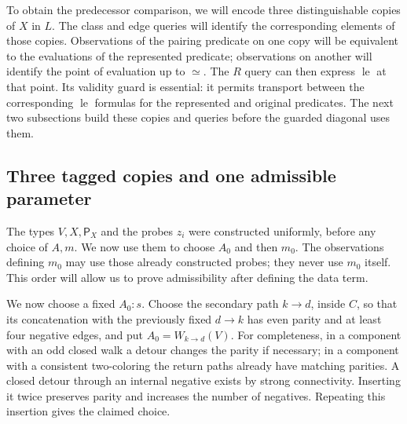 To obtain the predecessor comparison, we will encode three distinguishable
copies of $X$ in $L$.  The class and edge queries will identify the
corresponding elements of those copies.  Observations of the pairing
predicate on one copy will be equivalent to the evaluations of the
represented predicate; observations on another will identify the point
of evaluation up to $\simeq$.  The $R$ query can then express
$\operatorname{le}$ at that point.  Its validity guard is essential:
it permits transport between the corresponding
$\operatorname{le}$ formulas for the represented and original predicates.
The next two subsections build
these copies and queries before the guarded diagonal uses them.

\subsection{Three tagged copies and one admissible parameter}

The types $V,X,\mathsf P_X$ and the probes $z_i$ were constructed
uniformly, before any choice of $A,m$.  We now use them to choose
$A_0$ and then $m_0$.  The observations defining $m_0$ may use those
already constructed probes; they never use $m_0$ itself.  This order
will allow us to prove admissibility after defining the data term.

We now choose a fixed \(A_0:s\).  Choose the secondary path
\(k\to d\), inside \(C\), so that its concatenation with the
previously fixed \(d\to k\) has even parity and at least four
negative edges, and put \(A_0=W_{k\to d}(V)\).
For completeness, in a component with an odd closed walk a
detour changes the parity if necessary; in a component with a
consistent two-coloring the return paths already have matching
parities.  A closed detour through an internal negative exists
by strong connectivity.  Inserting it twice preserves parity
and increases the number of negatives.  Repeating this insertion
gives the claimed choice.


